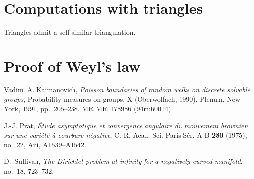 \documentclass[12pt]{amsart}
\begin{document}
\section*{Computations with triangles}

Triangles admit a self-similar triangulation.

\section*{Proof of Weyl's law}






%
%
\providecommand{\bysame}{\leavevmode\hbox to3em{\hrulefill}\thinspace}
\providecommand{\MR}{\relax\ifhmode\unskip\space\fi MR }
\providecommand{\MRhref}[2]{%
  \href{http://www.ams.org/mathscinet-getitem?mr=#1}{#2}
} 
\providecommand{\href}[2]{#2}
\begin{thebibliography}{Rob02}
Vadim~A. Kaimanovich, \emph{Poisson boundaries of random walks on discrete
  solvable groups}, Probability measures on groups, X (Oberwolfach, 1990),
  Plenum, New York, 1991, pp.~205--238. \MR{MR1178986 (94m:60014)}

J.-J. Prat, \emph{\'{E}tude asymptotique et convergence angulaire du mouvement
  brownien sur une vari\'et\'e \`a courbure n\'egative}, C. R. Acad. Sci. Paris
  S\'er. A-B \textbf{280} (1975), no.~22, Aiii, A1539--A1542.

D.~Sullivan, \emph{The {D}irichlet problem at infinity for a negatively curved
  manifold}, no.~18, 723--732.

\end{thebibliography}
\end{document}
